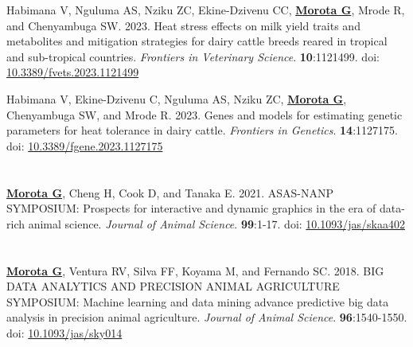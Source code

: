 \documentclass[margin,line,10pt]{res}
\newenvironment{list1}{
  \begin{list}{\ding{113}}{%
      \setlength{\itemsep}{0in}
      \setlength{\parsep}{0in} \setlength{\parskip}{0in}
      \setlength{\topsep}{0in} \setlength{\partopsep}{0in} 
      \setlength{\leftmargin}{0.17in}}}{\end{list}}
\begin{document}
\begin{resume}
\begin{list1}
  \item  [{\bf 5}.] Habimana V, Nguluma AS, Nziku ZC, Ekine-Dzivenu CC, \textbf{\underline{Morota G}}, Mrode R, and Chenyambuga SW. 2023. Heat stress effects on milk yield traits and metabolites and mitigation strategies for dairy cattle breeds reared in tropical and sub-tropical countries. \emph{Frontiers in Veterinary Science}. \textbf{10}:1121499. doi: \textcolor{blue}{\href{https://doi.org/10.3389/fvets.2023.1121499}{10.3389/fvets.2023.1121499}} 


  \vspace{0.5cm}

  \item  [{\bf 4}.] Habimana V, Ekine-Dzivenu C, Nguluma AS, Nziku ZC, \textbf{\underline{Morota G}}, Chenyambuga SW, and Mrode R. 2023. Genes and models for estimating genetic parameters for heat tolerance in dairy cattle. \emph{Frontiers in Genetics}. \textbf{14}:1127175. doi: \textcolor{blue}{\href{https://doi.org/10.3389/fgene.2023.1127175}{10.3389/fgene.2023.1127175}} 

\end{list1}


\section{}
\begin{list1}

 \item  [{\bf 3}.] \textbf{\underline{Morota G}}, Cheng H, Cook D, and Tanaka E. 2021. ASAS-NANP SYMPOSIUM: Prospects for interactive and dynamic graphics in the era of data-rich animal science. \emph{Journal of Animal Science}.  \textbf{99}:1-17. doi: \textcolor{blue}{\href{https://doi.org/10.1093/jas/skaa402}{10.1093/jas/skaa402}} 
   
\end{list1}


\section{}
\begin{list1}

 \item  [{\bf 2}.] \textbf{\underline{Morota G}}, Ventura RV, Silva FF, Koyama M, and Fernando SC. 2018. BIG DATA ANALYTICS AND PRECISION ANIMAL AGRICULTURE SYMPOSIUM: Machine learning and data mining advance predictive big data analysis in precision animal agriculture. \emph{Journal of Animal Science}. \textbf{96}:1540-1550. doi: \textcolor{blue}{\href{http://dx.doi.org/10.1093/jas/sky014}{10.1093/jas/sky014}}
   

\end{list1}
\end{resume}
\end{document}

